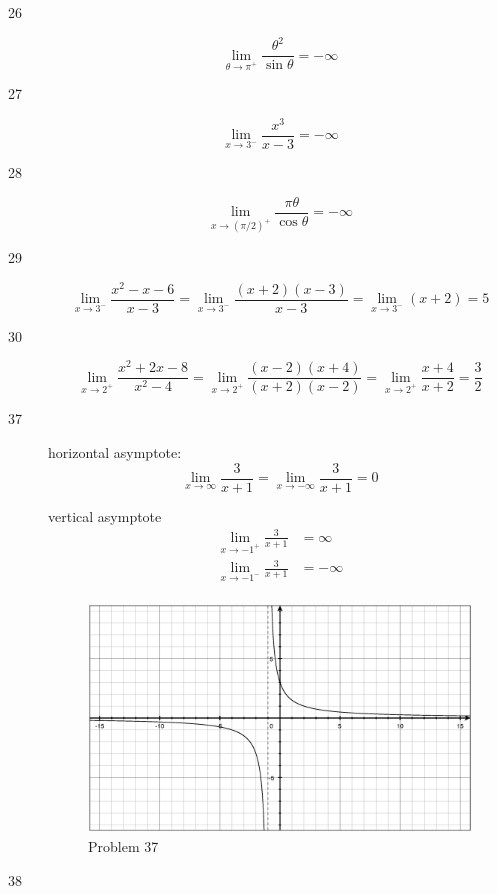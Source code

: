 \documentclass[fleqn]{exam}
\begin{document}
\begin{description}
\item[26]
\[
  \lim_{\theta \to \pi^+} \frac{\theta^2}{\sin \theta} = - \infty
\]

\item[27]
\[
  \lim_{x \to 3^-} \frac{x^3}{x - 3} = - \infty
\]

\item[28]
\[
  \lim_{x \to (\pi/2)^+} \frac{\pi \theta}{\cos \theta} = -\infty
\]

\item[29]
\[
  \lim_{x \to 3^-} \frac{x^2 - x - 6}{x - 3} = \lim_{x \to 3^-} \frac{(x + 2)(x - 3)}{x - 3} = \lim_{x \to 3^-} (x + 2) = 5
\]

\item[30]
\[
  \lim_{x \to 2^+} \frac{x^2 + 2x - 8}{x^2 - 4} = \lim_{x \to 2^+} \frac{(x - 2)(x + 4)}{(x + 2)(x - 2)} = \lim_{x \to 2^+} \frac{x + 4}{x + 2} = \frac{3}{2}
\]

\pagebreak

\item[37]
horizontal asymptote:
\[
  \lim_{x \to \infty} \frac{3}{x + 1} = \lim_{x \to -\infty} \frac{3}{x + 1} = 0
\]

vertical asymptote
\begin{align*}
  \lim_{x \to -1^+} \frac{3}{x + 1} &= \infty \\
  \lim_{x \to -1^-} \frac{3}{x + 1} &= -\infty \\
\end{align*}

\begin{figure}[H]
  \centering
  \includegraphics[scale=.3]{problem_37.eps}
  \caption*{Problem 37}
\end{figure}

\pagebreak

\item[38]


\end{description}
\end{document}
